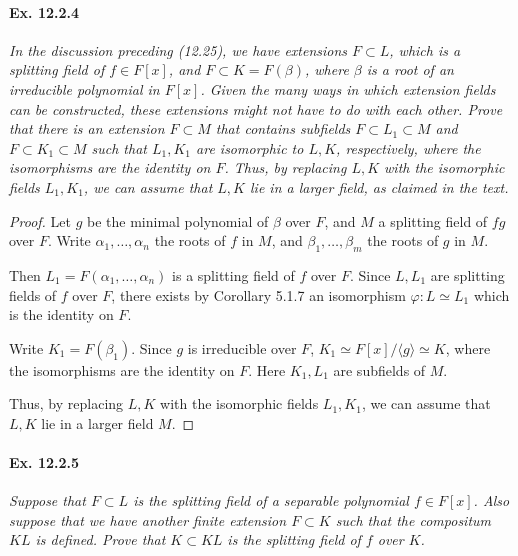 \documentclass[11pt,a4paper]{article}
\begin{document}
\paragraph{Ex. 12.2.4}

{\it In the discussion preceding (12.25), we have extensions $F\subset L$, which is a splitting field of $f \in F[x]$, and $F \subset K = F(\beta)$, where $\beta$ is a root of an irreducible polynomial in $F[x]$. Given the many ways in which extension fields can be constructed, these extensions might not have to do with each other. Prove that there is an extension $F\subset M$ that contains subfields $F \subset L_1 \subset M$ and $F \subset K_1 \subset M$ such that $L_1,K_1$ are isomorphic to $L,K$, respectively, where the isomorphisms are the identity on $F$. Thus, by replacing $L,K$ with the isomorphic fields $L_1,K_1$, we can assume that $L,K$ lie in a larger field, as claimed in the text.
}

\begin{proof}
Let $g$ be the minimal polynomial of $\beta$ over $F$, and $M$ a splitting field of $fg$ over $F$. Write $\alpha_1,\ldots,\alpha_n$ the roots of $f$ in $M$, and $\beta_1,\ldots,\beta_m$ the roots of $g$ in $M$. 

Then $L_1 = F(\alpha_1,\ldots,\alpha_n)$ is a splitting field of $f$ over $F$. Since $L,L_1$ are splitting fields of $f$ over $F$,  there exists by Corollary 5.1.7 an isomorphism $\varphi : L \simeq L_1$ which is the identity on $F$.

Write $K_1 = F(\beta_1)$. Since $g$ is irreducible over $F$, $K_1 \simeq F[x]/\langle g \rangle \simeq K$, where the isomorphisms are the identity on $F$. Here $K_1, L_1$ are subfields of $M$.

Thus, by replacing $L,K$ with the isomorphic fields $L_1,K_1$, we can assume that $L,K$ lie in a larger field $M$.
\end{proof}

\paragraph{Ex. 12.2.5}

{\it Suppose that $F\subset L$ is the splitting field of a separable polynomial $f\in F[x]$. Also suppose that we have another finite extension $F\subset K$ such that the compositum $KL$ is defined. Prove that $K\subset KL$ is the splitting field of $f$ over $K$.
}
\end{document}
